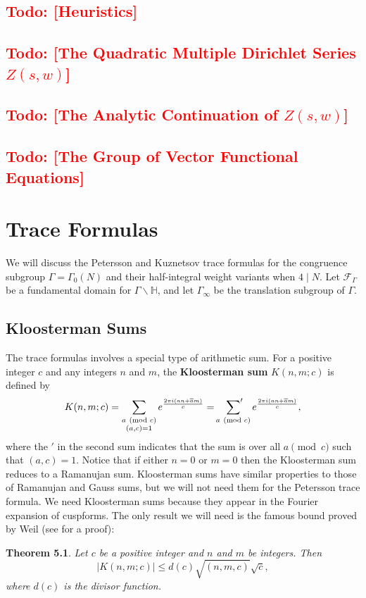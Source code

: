 \documentclass[12pt]{book}
\newtheorem{theorem}{Theorem}[section]
\theoremstyle{definition}\newframedtheorem{method}{Method}
\newcommand{\psum}{\sideset{}{'}\sum}
\newcommand{\tmod}[1]{\ \left(\text{mod }#1\right)}
\newcommand{\mc}{\mathcal}
\renewcommand{\H}{\mathbb{H}}
\newcommand{\G}{\Gamma}
\newcommand{\<}{\langle}
\renewcommand{\>}{\rangle}
\newcommand{\conj}{\overline}
\newcommand{\GH}{\G\backslash\H}
\newcommand{\todo}[1]{\textcolor{red}{\sf Todo: [#1]}}
\begin{document}
  \section{\todo{Heuristics}}
  \section{\todo{The Quadratic Multiple Dirichlet Series \texorpdfstring{$Z(s,w)$}{Z(s,w)}}}
  \section{\todo{The Analytic Continuation of \texorpdfstring{$Z(s,w)$}{Z(s,w)}}}
  \section{\todo{The Group of Vector Functional Equations}}

\chapter{Trace Formulas}
  We will discuss the Petersson and Kuznetsov trace formulas for the congruence subgroup $\G = \G_{0}(N)$ and their half-integral weight variants when $4 \mid N$. Let $\mc{F}_{\G}$ be a fundamental domain for $\GH$, and let $\G_{\infty}$ be the translation subgroup of $\G$.
  \section{Kloosterman Sums}
    The trace formulas involves a special type of arithmetic sum. For a positive integer $c$ and any integers $n$ and $m$, the \textbf{Kloosterman sum} $K(n,m;c)$ is defined by
    \[
      K(n,m;c) = \sum_{\substack{a \tmod{c} \\ (a,c) = 1}}e^{\frac{2\pi i(an+\conj{a}m)}{c}} = \psum_{a \tmod{c}}e^{\frac{2\pi i(an+\conj{a}m)}{c}},
    \]
    where the $'$ in the second sum indicates that the sum is over all $a \pmod{c}$ such that $(a,c) = 1$. Notice that if either $n = 0$ or $m = 0$ then the Kloosterman sum reduces to a Ramanujan sum. Kloosterman sums have similar properties to those of Ramanujan and Gauss sums, but we will not need them for the Petersson trace formula. We need Kloosterman sums because they appear in the Fourier expansion of cuspforms. The only result we will need is the famous bound proved by Weil (see \cite{weil1948some} for a proof):

    \begin{theorem}
      Let $c$ be a positive integer and $n$ and $m$ be integers. Then
      \[
        |K(n,m;c)| \le d(c)\sqrt{(n,m,c)}\sqrt{c},
      \]
      where $d(c)$ is the divisor function.
    \end{theorem}
\end{document}
